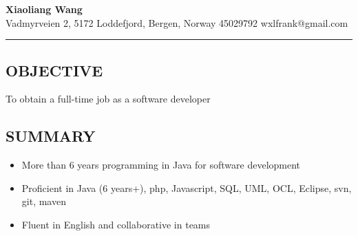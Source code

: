 \documentclass[12pt,letterpaper]{article}
\begin{document}
\begin{center}
{\color{shade}\LARGE \textbf{Xiaoliang Wang}}\\
\vspace{0.4em}
Vadmyrveien 2, 5172 Loddefjord, Bergen, Norway \quad {\color{shade}\Large\Mobilefone} 45029792 \quad {\color{shade}\Large\Letter} wxlfrank@gmail.com
\vspace{-0.5em}
\end{center}

\hrule
\vspace{0.5em}
\subsection*{\color{shade}OBJECTIVE}
To obtain a full-time job as a software developer
\subsection*{\color{shade}SUMMARY}
\begin{itemize}[leftmargin=*]
    \parskip=0em
    \item More than 6 years programming in Java for software development 
    \item Proficient in Java (6 years+),  php, Javascript, SQL, UML, OCL, Eclipse, svn, git, maven
    \item Fluent in English and collaborative in teams
\end{itemize}
\vspace{-0.5em}
\end{document}
